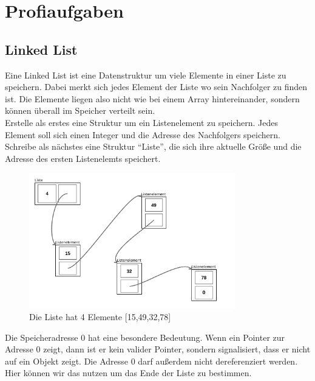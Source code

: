 \documentclass[c_worksheet.tex]{subfiles}
\begin{document}
  
\chapter{Profiaufgaben}

\section{Linked List}

Eine Linked List ist eine Datenstruktur um viele Elemente in einer Liste zu speichern. Dabei merkt sich jedes Element der Liste wo sein Nachfolger zu finden ist. Die Elemente liegen also nicht wie bei einem Array hintereinander, sondern können überall im Speicher verteilt sein. \\

Erstelle als erstes eine Struktur um ein Listenelement zu speichern. Jedes Element soll sich einen Integer und die Adresse des Nachfolgers speichern. \\
Schreibe als nächstes eine Struktur ``Liste'', die sich ihre aktuelle Größe und die Adresse des ersten Listenelemts speichert.

\begin{figure}[h]
\centering
\includegraphics[width=0.8\textwidth]{./Grafiken/Aufgaben/linkedList}
\caption{Die Liste hat 4 Elemente [15,49,32,78]} 
\end{figure}

Die Speicheradresse 0 hat eine besondere Bedeutung. Wenn ein Pointer zur Adresse 0 zeigt, dann ist er kein valider Pointer, sondern signalisiert, dass er nicht auf ein Objekt zeigt. Die Adresse 0 darf außerdem nicht dereferenziert werden. Hier können wir das nutzen um das Ende der Liste zu bestimmen.\\
\end{document}

